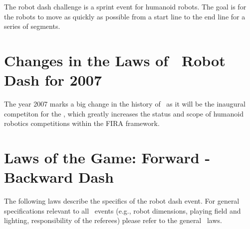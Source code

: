 \documentclass[12pt]{hurocup}
\begin{document}
The robot dash challenge is a sprint event for humanoid robots. The
goal is for the robots to move as quickly as possible from a start
line to the end line for a series of segments.

\section{Changes in the Laws of \HuroCup\ Robot Dash for 2007}

The year 2007 marks a big change in the history of \HuroCup\ as it
will be the inaugural competiton for the \HuroCup, which greatly
increases the status and scope of humanoid robotics competitions
within the FIRA framework.

\section{Laws of the Game: Forward - Backward Dash}
\label{sec:laws-forward-backward-dash}

The following laws describe the specifics of the robot dash event. For
general specifications relevant to all \HuroCup\ events (e.g., robot
dimensions, playing field and lighting, responsibility of the
referees) please refer to the general \HuroCup\ laws.

\label{law:field-of-play}
\end{document}
